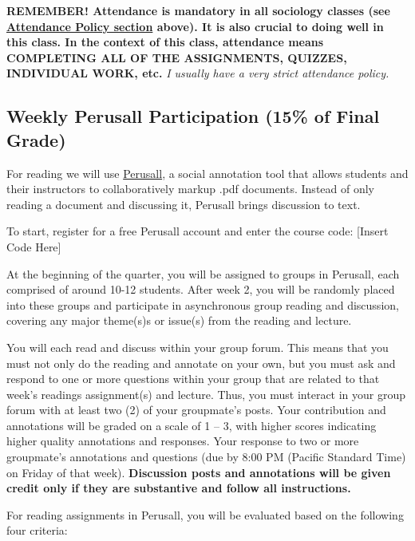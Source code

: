 \documentclass[11pt,]{article}
\begin{document}
\textbf{REMEMBER! Attendance is mandatory in all sociology classes (see
\protect\hyperlink{attendance}{Attendance Policy section} above). It is
also crucial to doing well in this class. In the context of this class,
attendance means COMPLETING ALL OF THE ASSIGNMENTS, QUIZZES, INDIVIDUAL
WORK, etc.} \emph{I usually have a very strict attendance policy.}

\hypertarget{weekly-perusall-participation-15-of-final-grade}{%
\subsection{Weekly Perusall Participation (15\% of Final
Grade)}\label{weekly-perusall-participation-15-of-final-grade}}

For reading we will use
\href{https://support.perusall.com/hc/en-us}{Perusall}, a social
annotation tool that allows students and their instructors to
collaboratively markup .pdf documents. Instead of only reading a
document and discussing it, Perusall brings discussion to text.

To start, register for a free Perusall account and enter the course
code: {[}Insert Code Here{]}

At the beginning of the quarter, you will be assigned to groups in
Perusall, each comprised of around 10-12 students. After week 2, you
will be randomly placed into these groups and participate in
asynchronous group reading and discussion, covering any major theme(s)s
or issue(s) from the reading and lecture.

You will each read and discuss within your group forum. This means that
you must not only do the reading and annotate on your own, but you must
ask and respond to one or more questions within your group that are
related to that week's readings assignment(s) and lecture. Thus, you
must interact in your group forum with at least two (2) of your
groupmate's posts. Your contribution and annotations will be graded on a
scale of 1 -- 3, with higher scores indicating higher quality
annotations and responses. Your response to two or more groupmate's
annotations and questions (due by 8:00 PM (Pacific Standard Time) on
Friday of that week). \textbf{Discussion posts and annotations will be
given credit only if they are substantive and follow all instructions.}

For reading assignments in Perusall, you will be evaluated based on the
following four criteria:
\end{document}

